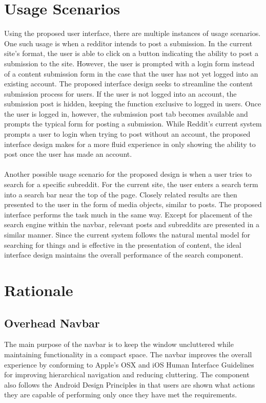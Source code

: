 \documentclass{article}
\begin{document}
\section{Usage Scenarios} Using the proposed user interface, there are multiple instances of usage scenarios. One such usage is when a redditor intends to post a submission. In the current site's format, the user is able to click on a button indicating the ability to post a submission to the site. However, the user is prompted with a login form instead of a content submission form in the case that the user has not yet logged into an existing account. The proposed interface design seeks to streamline the content submission process for users. If the user is not logged into an account, the submission post is hidden, keeping the function exclusive to logged in users. Once the user is logged in, however, the submission post tab becomes available and prompts the typical form for posting a submission. While Reddit's current system prompts a user to login when trying to post without an account, the proposed interface design makes for a more fluid experience in only showing the ability to post once the user has made an account.\\
\\
\indent Another possible usage scenario for the proposed design is when a user tries to search for a specific subreddit. For the current site, the user enters a search term into a search bar near the top of the page. Closely related results are then presented to the user in the form of media objects, similar to posts. The proposed interface performs the task much in the same way. Except for placement of the search engine within the navbar, relevant posts and subreddits are presented in a similar manner. Since the current system follows the natural mental model for searching for things and is effective in the presentation of content, the ideal interface design maintains the overall performance of the search component.

\section{Rationale}

\subsection{Overhead Navbar} The main purpose of the navbar is to keep the window uncluttered while maintaining functionality in a compact space. The navbar improves the overall experience by conforming to Apple's OSX and iOS Human Interface Guidelines for improving hierarchical navigation and reducing cluttering. The component also follows the Android Design Principles in that users are shown what actions they are capable of performing only once they have met the requirements.
\end{document}
